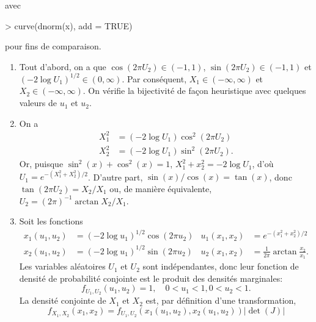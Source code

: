 \begin{exercice}
\begin{enumerate}
\begin{enumerate}[i)]
      avec
\begin{Schunk}
\begin{Sinput}
> curve(dnorm(x), add = TRUE)
\end{Sinput}
\end{Schunk}
      pour fins de comparaison.
    \end{enumerate}
  \end{enumerate}
  \begin{sol}
    \begin{enumerate}
    \item Tout d'abord, on a que $\cos (2\pi U_{2}) \in (-1, 1)$,
      $\sin (2\pi U_{2}) \in (-1, 1)$ et $(-2 \log U_1)^{1/2} \in (0,
      \infty)$. Par conséquent, $X_1 \in (-\infty, \infty)$ et $X_2
      \in (-\infty, \infty)$. On vérifie la bijectivité de façon
      heuristique avec quelques valeurs de $u_1$ et $u_2$.
    \item On a
      \begin{align*}
        X_1^2 &= (-2 \log U_1) \cos^2 (2\pi U_2) \\
        X_2^2 &= (-2 \log U_1) \sin^2 (2\pi U_2).
      \end{align*}
      Or, puisque $\sin^{2}(x) + \cos^{2}(x) = 1$, $X_1^2 + x_2^2 = -2
      \log U_1$, d'où $U_1 = e^{-(X_1^2 + X_2^2)/2}$. D'autre part,
      $\sin(x)/\cos(x) = \tan(x)$, donc $\tan (2\pi U_2) = X_2/X_1$
      ou, de manière équivalente, $U_2 = (2 \pi)^{-1} \arctan
      X_2/X_1$.
    \item Soit les fonctions
      \begin{align*}
        x_1(u_1, u_2)
        &= (-2\log u_1)^{1/2} \cos (2\pi u_2)  &
        u_1(x_1,x_2)
        &= e^{-(x_1^2 + x_2^2)/2}  \\
        x_2(u_1, u_2)
        &= (-2\log u_1)^{1/2} \sin (2\pi u_2) &
        u_2(x_1, x_2)
        &= \frac{1}{2\pi} \arctan \frac{x_2}{x_1}.
      \end{align*}
      Les variables aléatoires $U_1$ et $U_2$ sont indépendantes, donc
      leur fonction de densité de probabilité conjointe est le produit
      des densités marginales:
      \begin{displaymath}
        f_{U_1, U_2}(u_1, u_2) = 1, \quad 0 < u_1 < 1, 0 < u_2 < 1.
      \end{displaymath}
      La densité conjointe de $X_1$ et $X_2$ est, par définition d'une
      transformation,
      \begin{displaymath}
        f_{X_1,X_2}(x_1, x_2) =
        f_{U_1, U_2}(x_1(u_1, u_2), x_2(u_1,u_2)) |\det(J)|

\end{displaymath}
\end{enumerate}
\end{sol}
\end{exercice}
